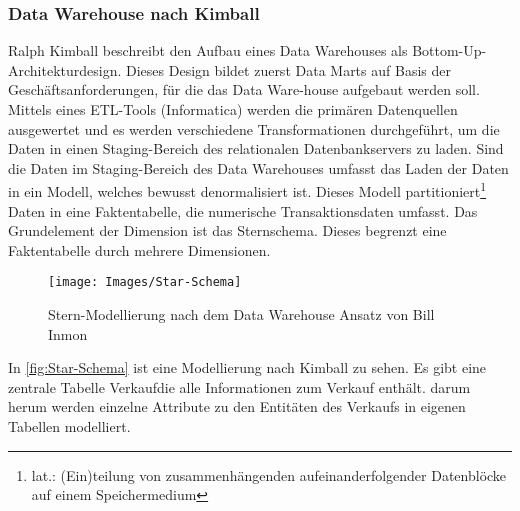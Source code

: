 \subsubsection{Data Warehouse nach Kimball}
Ralph Kimball beschreibt den Aufbau eines Data Warehouses als Bottom-Up- Architekturdesign. Dieses Design bildet zuerst Data Marts auf Basis der Geschäftsanforderungen, für die das Data Ware-house aufgebaut werden soll. Mittels eines ETL-Tools (Informatica) werden die primären Datenquellen ausgewertet und es werden verschiedene Transformationen durchgeführt, um die Daten in einen Staging-Bereich des relationalen Datenbankservers zu laden. 
Sind die Daten im Staging-Bereich des Data Warehouses umfasst das Laden der Daten in ein Modell, welches bewusst denormalisiert ist. Dieses Modell partitioniert\footnote{lat.: (Ein)teilung von zusammenhängenden aufeinanderfolgender Datenblöcke auf einem Speichermedium} Daten in eine Faktentabelle, die numerische Transaktionsdaten umfasst.
Das Grundelement der Dimension ist das Sternschema. Dieses begrenzt eine Faktentabelle durch mehrere Dimensionen. 
\cite{Astera:Kimmball_Inmon}\cite{ITEW:Patrik_02.05}
\begin{figure}[H]
	\begin{center}
		\texttt{[image: Images/Star-Schema]}
		\caption{Stern-Modellierung nach dem Data Warehouse Ansatz von Bill Inmon}
		\label{fig:Star-Schema}
	\end{center}
\end{figure}
In \autoref{fig:Star-Schema} ist eine Modellierung nach Kimball zu sehen. Es gibt eine zentrale Tabelle \glqq Verkauf\grqq die alle Informationen zum Verkauf enthält. darum herum werden einzelne Attribute zu den Entitäten des Verkaufs in eigenen Tabellen modelliert.

